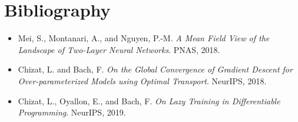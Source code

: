 \documentclass[11pt,a4paper,oneside,openany]{memoir}
\theoremstyle{definition}
\begin{document}
\chapter*{Bibliography}
\begin{itemize}
\item Mei, S., Montanari, A., and Nguyen, P.-M. \emph{A Mean Field View of the Landscape of Two-Layer Neural Networks}. PNAS, 2018.
\item Chizat, L. and Bach, F. \emph{On the Global Convergence of Gradient Descent for Over-parameterized Models using Optimal Transport}. NeurIPS, 2018.
\item Chizat, L., Oyallon, E., and Bach, F. \emph{On Lazy Training in Differentiable Programming}. NeurIPS, 2019.
\end{itemize}
\end{document}
